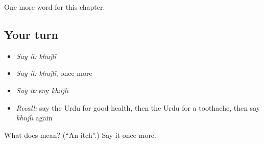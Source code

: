 \begin{grammarlens}[title={What you've built}]
One more word for this chapter.
\end{grammarlens}

\subsection*{Your turn}
\begin{itemize}
\raggedright
  \item \emph{Say it:} \emph{khujlī}
  \item \emph{Say it:} \emph{khujlī}, once more
  \item \emph{Say it:} say \emph{khujlī}
  \item \emph{Recall:} say the Urdu for good health, then the Urdu for a toothache, then say \emph{khujlī} again
\end{itemize}

\begin{tcolorbox}[breakable,colback=teal!4,colframe=teal!35!black,title={Before you move on}]
What does  mean? (\textquotedblleft{}An itch\textquotedblright{}.) Say it once more.
\end{tcolorbox}

